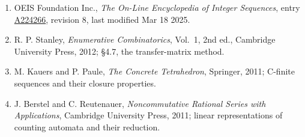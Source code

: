 \documentclass[11pt]{article}
\theoremstyle{definition}
\begin{document}
\begin{enumerate}

\item OEIS Foundation Inc., \emph{The On-Line Encyclopedia of Integer Sequences}, entry \href{https://oeis.org/A224266}{A224266}, revision 8, last modified Mar 18 2025.

\item R. P. Stanley, \emph{Enumerative Combinatorics}, Vol.~1, 2nd ed., Cambridge University Press, 2012; \S4.7, the transfer-matrix method.

\item M. Kauers and P. Paule, \emph{The Concrete Tetrahedron}, Springer, 2011; C-finite sequences and their closure properties.

\item J. Berstel and C. Reutenauer, \emph{Noncommutative Rational Series with Applications}, Cambridge University Press, 2011; linear representations of counting automata and their reduction.

\end{enumerate}
\end{document}
